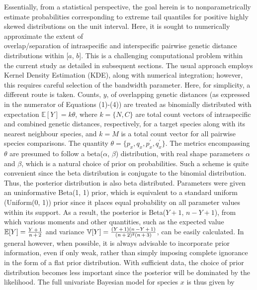 \documentclass[12pt]{article}
\begin{document}
Essentially, from a statistical perspective, the goal herein is to nonparametrically estimate probabilities corresponding to extreme tail quantiles for positive highly skewed distributions on the unit interval. Here, it is sought to numerically approximate the extent of \\ overlap/separation of intraspecific and interspecific pairwise genetic distance distributions within [$a$, $b$]. This is a challenging computational problem within the current study as detailed in subsequent sections. The usual approach employs Kernel Density Estimation (KDE), along with numerical integration; however, this requires careful selection of the bandwidth parameter. Here, for simplicity, a different route is taken. Counts, $y$, of overlapping genetic distances (as expressed in the numerator of Equations (1)-(4)) are treated as binomially distributed with expectation $\mathbb{E}[Y] = k\theta$, where $k = \{N, C\}$ are total count vectors of intraspecific and combined genetic distances, respectively, for a target species along with its nearest neighbour species, and $k = M$ is a total count vector for all pairwise species comparisons. The quantity $\theta = \{p_x, q_x, p^{'}_x, q^{'}_x\}$. The metrics encompassing $\theta$ are presumed to follow a beta($\alpha$, $\beta$) distribution, with real shape parameters $\alpha$ and $\beta$, which is a natural choice of prior on probabilities. Such a scheme is quite convenient since the beta distribution is conjugate to the binomial distribution. Thus, the posterior distribution is also beta distributed. Parameters were given an uninformative Beta(1, 1) prior, which is equivalent to a standard uniform (Uniform(0, 1)) prior since it places equal probability on all parameter values within its support. As a result, the posterior is Beta($Y + 1$, $n - Y + 1$), from which various moments and other quantities, such as the expected value $\mathbb{E}[Y] = \frac{Y \hspace{0.5mm} + \hspace{0.5mm} 1}{n \hspace{0.5mm} + \hspace{0.5mm} 2}$ and variance $\mathbb{V}[Y] = \frac{(Y \hspace{0.5mm} + \hspace{0.5mm} 1)(n \hspace{0.5mm} - Y \hspace{0.5mm} + \hspace{0.5mm} 1)}{(n \hspace{0.5mm} + \hspace{0.5mm} 2)^2(n \hspace{0.5mm} + \hspace{0.5mm} 3)}$, can be easily calculated. In general however, when possible, it is always advisable to incorporate prior information, even if only weak, rather than simply imposing complete ignorance in the form of a flat prior distribution. With sufficient data, the choice of prior distribution becomes less important since the posterior will be dominated by the likelihood.  The full univariate Bayesian model for species $x$ is thus given by
\end{document}
